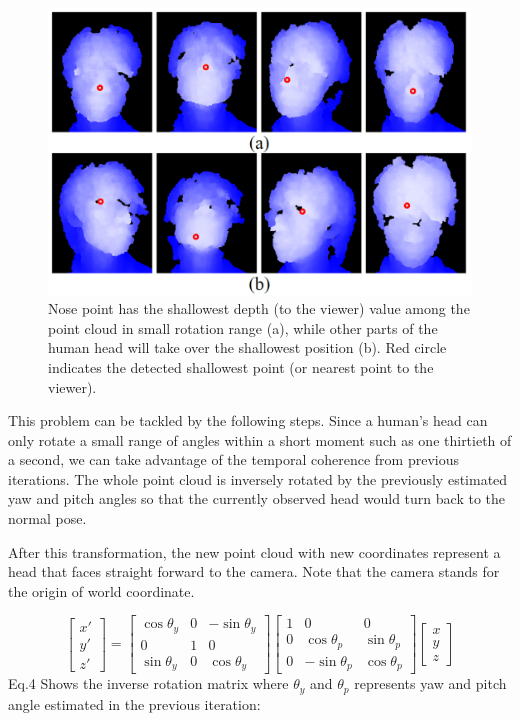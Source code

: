 \begin{figure}
\includegraphics[width=1.0\linewidth]{./fig8.png}
\caption{Nose point has the shallowest depth (to the viewer) value among the point cloud in small rotation range (a), while other parts of the human head will take over the shallowest position (b). Red circle indicates the detected shallowest point (or nearest point to the viewer).}
\label{fig:8}       %
\end{figure}

This problem can be tackled by the following steps. Since a human’s head can only rotate a small range of angles within a short moment such as one thirtieth of a second, we can take advantage of the temporal coherence from previous iterations. The whole point cloud is inversely rotated by the previously estimated yaw and pitch angles so that the currently observed head would turn back to the normal pose.

After this transformation, the new point cloud with new coordinates represent a head that faces straight forward to the camera. Note that the camera stands for the origin of world coordinate. 

\begin{equation}
\begin{bmatrix}
x'\\
y'\\
z'
\end{bmatrix}
=
\begin{bmatrix}
\cos{\theta_{y}}& 0 & -\sin{\theta_{y}}	\\
0 & 1 & 0	\\
\sin{\theta_{y}}& 0 & \cos{\theta_{y}}
\end{bmatrix}
\begin{bmatrix}
1 & 0 & 0	\\
0 & \cos{\theta_{p}} & \sin{\theta_{p}}	\\
0 & -\sin{\theta_{p}} & \cos{\theta_{p}}
\end{bmatrix}
\begin{bmatrix}
x \\
y \\
z
\end{bmatrix}
\end{equation}
Eq.4 Shows the inverse rotation matrix where $\theta_{y}$ and  $\theta_{p}$ represents yaw and pitch angle estimated in the previous iteration:

